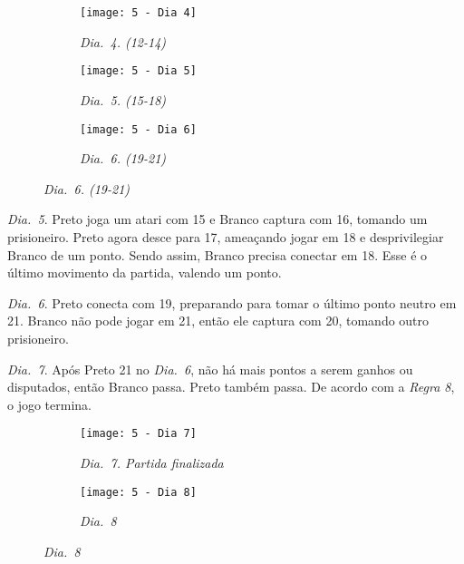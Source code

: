 \begin{figure}[h!]
  \centering
  \begin{subfigure}[t]{.3\textwidth}
    \centering
    \texttt{[image: 5 - Dia 4]}
    \captionsetup{justification=centering}
    \caption*{\emph{Dia.\@~4. (12-14)}}
  \end{subfigure}
  \hfill
  \begin{subfigure}[t]{.3\textwidth}
    \centering
    \texttt{[image: 5 - Dia 5]}
    \captionsetup{justification=centering}
    \caption*{\emph{Dia.\@~5. (15-18)}}
  \end{subfigure}
  \hfill
  \begin{subfigure}[t]{.3\textwidth}
    \centering
    \texttt{[image: 5 - Dia 6]}
    \captionsetup{justification=centering}
    \caption*{\emph{Dia.\@~6. (19-21)}}
  \end{subfigure}
\end{figure}

\emph{Dia.\@~5}. Preto joga um atari com 15 e Branco captura com 16, tomando um prisioneiro. Preto agora desce para 17, ameaçando jogar em 18 e desprivilegiar Branco de um ponto. Sendo assim, Branco precisa conectar em 18. Esse é o último movimento da partida, valendo um ponto.

\emph{Dia.\@~6}. Preto conecta com 19, preparando para tomar o último ponto neutro em 21. Branco não pode jogar em 21, então ele captura com 20, tomando outro prisioneiro.

\pagebreak

\emph{Dia.\@~7}. Após Preto 21 no \emph{Dia.\@~6}, não há mais pontos a serem ganhos ou disputados, então Branco passa. Preto também passa. De acordo com a \emph{Regra 8}, o jogo termina.

\begin{figure}[h!]
  \centering
  \begin{subfigure}[t]{.3\textwidth}
    \centering
    \texttt{[image: 5 - Dia 7]}
    \caption*{\emph{Dia.\@~7. Partida finalizada}}
  \end{subfigure}
  \hspace{1cm}
  \begin{subfigure}[t]{.3\textwidth}
    \centering
    \texttt{[image: 5 - Dia 8]}
    \captionsetup{justification=centering}
    \caption*{\emph{Dia.\@~8}}
  \end{subfigure}
\end{figure}

